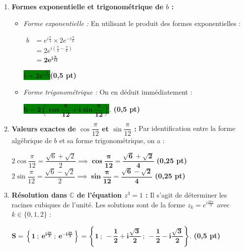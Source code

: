\documentclass[12pt,a4paper]{article}
\begin{document}
\begin{enumerate}
\begin{enumerate}
        Le résultat est bien démontré. \hfill \textbf{(0,5 pt)}

        \item \textbf{Formes exponentielle et trigonométrique de $b$ :}
        \begin{itemize}
            \item \textit{Forme exponentielle :} En utilisant le produit des formes exponentielles :
            
            $\begin{aligned}
            b &= e^{i\frac{\pi}{4}} \times 2e^{-i\frac{\pi}{6}} \\
            &= 2e^{i\left(\frac{\pi}{4} - \frac{\pi}{6}\right)} \\
            &= \mathbf{2e^{i\frac{\pi}{12}}}
            \end{aligned}$
            
            \colorbox{green}{$b= \mathbf{2e^{i\frac{\pi}{12}}}$}\hfill \textbf{(0,5 pt)}
            \item \textit{Forme trigonométrique :} On en déduit immédiatement :
            
            \colorbox{green}{$\mathbf{b = 2\left(\cos\dfrac{\pi}{12} + i\sin\dfrac{\pi}{12}\right)}$}. \hfill \textbf{(0,5 pt)}
        \end{itemize}

        \item \textbf{Valeurs exactes de $\cos \dfrac{\pi}{12}$ et $\sin \dfrac{\pi}{12}$ :}
        Par identification entre la forme algébrique de $b$ et sa forme trigonométrique, on a :
        
        $2\cos\dfrac{\pi}{12} = \dfrac{\sqrt{6}+\sqrt{2}}{2} \implies \mathbf{\cos\dfrac{\pi}{12} = \dfrac{\sqrt{6}+\sqrt{2}}{4}}$ \hfill \textbf{(0,25 pt)} \\
        
        $2\sin\dfrac{\pi}{12} = \dfrac{\sqrt{6}-\sqrt{2}}{2} \implies \mathbf{\sin\dfrac{\pi}{12} = \dfrac{\sqrt{6}-\sqrt{2}}{4}}$ \hfill \textbf{(0,25 pt)}

        \item \textbf{Résolution dans $\mathbb{C}$ de l'équation $z^3 = 1$ :}
        Il s'agit de déterminer les racines cubiques de l'unité. Les solutions sont de la forme $z_k = e^{i\frac{2k\pi}{3}}$ avec $k \in \{0, 1, 2\}$ :

        $\mathbf{S = \left\{1 \ ; \ e^{i\frac{2\pi}{3}} \ ; \ e^{-i\frac{2\pi}{3}}\right\} = \left\{1 \ ; \ -\dfrac{1}{2} + i\dfrac{\sqrt{3}}{2} \ ; \ -\dfrac{1}{2} - i\dfrac{\sqrt{3}}{2}\right\}}$. \hfill \textbf{(0,5 pt)}


\end{enumerate}
\end{enumerate}
\end{document}
